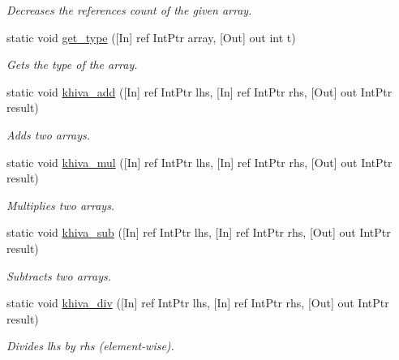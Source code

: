 \begin{DoxyCompactItemize}
\begin{DoxyCompactList}\small\item\em Decreases the references count of the given array.\end{DoxyCompactList}\item 
static void \mbox{\hyperlink{classkhiva_1_1interop_1_1_d_l_l_array_afbcddd8c8ef3c095cb1d37366f6012a7}{get\+\_\+type}} (\mbox{[}In\mbox{]} ref Int\+Ptr array, \mbox{[}Out\mbox{]} out int t)
\begin{DoxyCompactList}\small\item\em Gets the type of the array.\end{DoxyCompactList}\item 
static void \mbox{\hyperlink{classkhiva_1_1interop_1_1_d_l_l_array_a4c9506632f032803da33e8de37f8de63}{khiva\+\_\+add}} (\mbox{[}In\mbox{]} ref Int\+Ptr lhs, \mbox{[}In\mbox{]} ref Int\+Ptr rhs, \mbox{[}Out\mbox{]} out Int\+Ptr result)
\begin{DoxyCompactList}\small\item\em Adds two arrays.\end{DoxyCompactList}\item 
static void \mbox{\hyperlink{classkhiva_1_1interop_1_1_d_l_l_array_aa7241f7a40f599f9654a4bb5fad143c4}{khiva\+\_\+mul}} (\mbox{[}In\mbox{]} ref Int\+Ptr lhs, \mbox{[}In\mbox{]} ref Int\+Ptr rhs, \mbox{[}Out\mbox{]} out Int\+Ptr result)
\begin{DoxyCompactList}\small\item\em Multiplies two arrays. \end{DoxyCompactList}\item 
static void \mbox{\hyperlink{classkhiva_1_1interop_1_1_d_l_l_array_aaff9621d2933f2b9900be47987e4ceee}{khiva\+\_\+sub}} (\mbox{[}In\mbox{]} ref Int\+Ptr lhs, \mbox{[}In\mbox{]} ref Int\+Ptr rhs, \mbox{[}Out\mbox{]} out Int\+Ptr result)
\begin{DoxyCompactList}\small\item\em Subtracts two arrays. \end{DoxyCompactList}\item 
static void \mbox{\hyperlink{classkhiva_1_1interop_1_1_d_l_l_array_ab87ce8c6cc203ba558edd5ea2c3fba57}{khiva\+\_\+div}} (\mbox{[}In\mbox{]} ref Int\+Ptr lhs, \mbox{[}In\mbox{]} ref Int\+Ptr rhs, \mbox{[}Out\mbox{]} out Int\+Ptr result)
\begin{DoxyCompactList}\small\item\em Divides lhs by rhs (element-\/wise). \end{DoxyCompactList}\item 

\end{DoxyCompactItemize}
